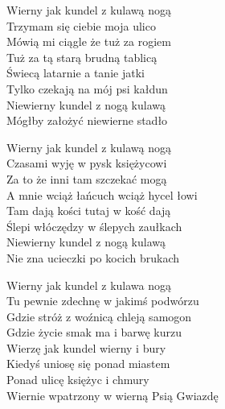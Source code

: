 \begin{text}
    Wierny jak kundel z kulawą nogą\\
    Trzymam się ciebie moja ulico\\
    Mówią mi ciągle że tuż za rogiem\\
    Tuż za tą starą brudną tablicą\\
    Świecą latarnie a tanie jatki\\
    Tylko czekają na mój psi kałdun\\
    Niewierny kundel z nogą kulawą\\
    Mógłby założyć niewierne stadło

    Wierny jak kundel z kulawą nogą\\
    Czasami wyję w pysk księżycowi\\
    Za to że inni tam szczekać mogą\\
    A mnie wciąż łańcuch wciąż hycel łowi\\
    Tam dają kości tutaj w kość dają\\
    Ślepi włóczędzy w ślepych zaułkach\\
    Niewierny kundel z nogą kulawą\\
    Nie zna ucieczki po kocich brukach

    Wierny jak kundel z kulawa nogą\\
    Tu pewnie zdechnę w jakimś podwórzu\\
    Gdzie stróż z woźnicą chleją samogon\\
    Gdzie życie smak ma i barwę kurzu\\
    Wierzę jak kundel wierny i bury\\
    Kiedyś uniosę się ponad miastem\\
    Ponad ulicę księżyc i chmury\\
    Wiernie wpatrzony w wierną Psią Gwiazdę
\end{text}
\begin{chord}

\end{chord}